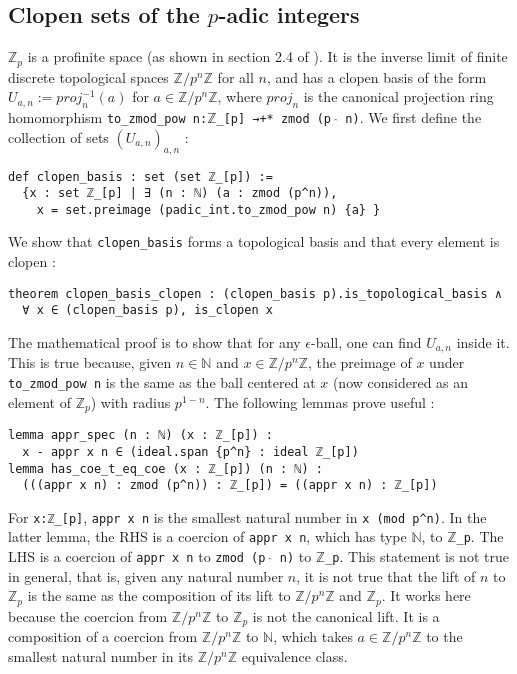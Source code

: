 \documentclass[a4paper,UKenglish,cleveref, autoref, thm-restate,pdfa]{lipics-v2021}
\newcommand{\lean}[1]{\texttt{#1}\xspace} %
\begin{document}
\subsection{Clopen sets of the $p$-adic integers}
$\mathbb{Z}_p$ is a profinite space (as shown in section 2.4 of \cite{witt}). It is the inverse limit of finite
discrete topological spaces $\mathbb{Z}/p^n \mathbb{Z}$ for all $n$, and has a clopen basis of the
form $U_{a,n} := proj_n ^{-1} (a)$ for $a \in \mathbb{Z}/p^n \mathbb{Z}$, where $proj_n$ is the
canonical projection ring homomorphism \lean{to\_zmod\_pow n:$\mathbb{Z}$\_[p] →+* zmod (p $\hat{}$ n)}. 
We first define the collection of sets $(U_{a,n})_{a,n}$ :
\begin{lstlisting}
def clopen_basis : set (set ℤ_[p]) := 
  {x : set ℤ_[p] | ∃ (n : ℕ) (a : zmod (p^n)), 
    x = set.preimage (padic_int.to_zmod_pow n) {a} }
\end{lstlisting}
We show that \lean{clopen\_basis} forms a topological basis and that every element is
clopen :
\begin{lstlisting}
theorem clopen_basis_clopen : (clopen_basis p).is_topological_basis ∧ 
  ∀ x ∈ (clopen_basis p), is_clopen x
\end{lstlisting}
The mathematical proof is to show that for any $\epsilon$-ball, one can find $U_{a,n}$ inside it.
This is true because, given $n \in \mathbb{N}$ and $x \in \mathbb{Z} / p^n \mathbb{Z}$, the preimage of $x$ 
under \lean{to\_zmod\_pow n} is the same as the ball centered at $x$ (now considered as an element of $\mathbb{Z}_p$) with radius $p^{1 - n}$. 
The following lemmas prove useful :
\begin{lstlisting}
lemma appr_spec (n : ℕ) (x : ℤ_[p]) : 
  x - appr x n ∈ (ideal.span {p^n} : ideal ℤ_[p])
lemma has_coe_t_eq_coe (x : ℤ_[p]) (n : ℕ) : 
  (((appr x n) : zmod (p^n)) : ℤ_[p]) = ((appr x n) : ℤ_[p])
\end{lstlisting}
For \lean{x:ℤ\_[p]}, \lean{appr x n} is the smallest natural number in \lean{x (mod p\textasciicircum n)}. 
In the latter lemma, the RHS is a coercion of \lean{appr x n}, which has type \lean{$\mathbb{N}$}, to \lean{$\mathbb{Z}$\_p}. 
The LHS is a coercion of \lean{appr x n} to \lean{zmod (p $\hat{}$ n)} to \lean{$\mathbb{Z}$\_p}. 
This statement is not true in general, that is, given any natural number $n$, it is not true that the lift of $n$ to $\mathbb{Z}_p$ 
is the same as the composition of its lift to $\mathbb{Z}/p^n \mathbb{Z}$ and $\mathbb{Z}_p$. 
It works here because the coercion from $\mathbb{Z}/p^n \mathbb{Z}$ to $\mathbb{Z}_p$ is not the canonical lift.
It is a composition of a coercion from $\mathbb{Z}/p^n \mathbb{Z}$ to $\mathbb{N}$, which takes
$a \in \mathbb{Z}/p^n \mathbb{Z}$ to the smallest natural number in its
$\mathbb{Z}/p^n \mathbb{Z}$ equivalence class. 
\end{document}
